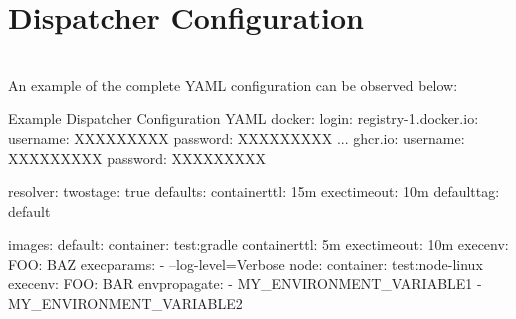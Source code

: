 \chapter{Dispatcher Configuration}\label{chap:dispatcher_config}


\noindent\\An example of the complete YAML configuration can be observed below:\\


\begin{code}{Example Dispatcher Configuration YAML}{}{}
docker:
    login:
        registry-1.docker.io:
            username: XXXXXXXXX
            password: XXXXXXXXX
        ...
        ghcr.io:
            username: XXXXXXXXX
            password: XXXXXXXXX

resolver:
    twostage: true
    defaults:
        containerttl: 15m
        exectimeout: 10m
        defaulttag: default

    images:
        default:
            container: test:gradle
            containerttl: 5m
            exectimeout: 10m
            execenv:
                FOO: BAZ
            execparams:
                - --log-level=Verbose
        node: 
            container: test:node-linux
            execenv:
                FOO: BAR
            envpropagate:
                - MY_ENVIRONMENT_VARIABLE1
                - MY_ENVIRONMENT_VARIABLE2

\end{code}









